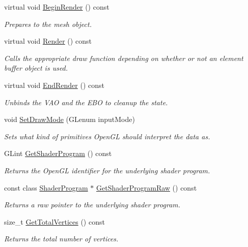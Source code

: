 \begin{DoxyCompactItemize}
virtual void \hyperlink{class_rendering_object_a878582ad56859856506a6d4c4be393e9}{Begin\+Render} () const
\begin{DoxyCompactList}\small\item\em Prepares to the mesh object. \end{DoxyCompactList}\item
virtual void \hyperlink{class_rendering_object_aee6affd69495adc61bae0e71433d353a}{Render} () const
\begin{DoxyCompactList}\small\item\em Calls the appropriate draw function depending on whether or not an element buffer object is used. \end{DoxyCompactList}\item
virtual void \hyperlink{class_rendering_object_abc5f87208a9c918f3d281dd673cb5a24}{End\+Render} () const
\begin{DoxyCompactList}\small\item\em Unbinds the V\+AO and the E\+BO to cleanup the state. \end{DoxyCompactList}\item
void \hyperlink{class_rendering_object_aa627eb310f11d0e04dbbb3665f58bb4e}{Set\+Draw\+Mode} (G\+Lenum input\+Mode)
\begin{DoxyCompactList}\small\item\em Sets what kind of primitives Open\+GL should interpret the data as. \end{DoxyCompactList}\item
G\+Lint \hyperlink{class_rendering_object_abe3637190e30c5483e9505743c75bcdb}{Get\+Shader\+Program} () const
\begin{DoxyCompactList}\small\item\em Returns the Open\+GL identifier for the underlying shader program. \end{DoxyCompactList}\item
const class \hyperlink{class_shader_program}{Shader\+Program} $\ast$ \hyperlink{class_rendering_object_ab32a982b996ebaca66f4f8b9f4e548b2}{Get\+Shader\+Program\+Raw} () const
\begin{DoxyCompactList}\small\item\em Returns a raw pointer to the underlying shader program. \end{DoxyCompactList}\item
size\+\_\+t \hyperlink{class_rendering_object_af83dd72431c620145b06d2e1bf7a9f3e}{Get\+Total\+Vertices} () const
\begin{DoxyCompactList}\small\item\em Returns the total number of vertices. \end{DoxyCompactList}\item

\end{DoxyCompactItemize}
